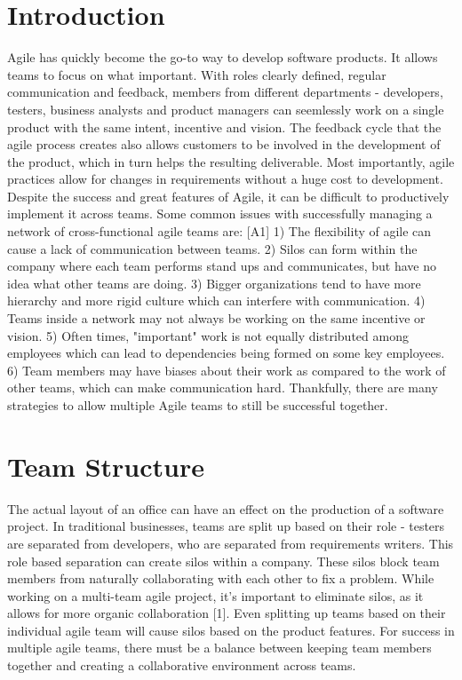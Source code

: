 \documentclass[sigplan,screen]{acmart}
\begin{document}
\section{Introduction}
Agile has quickly become the go-to way to develop software products.
It allows teams to focus on what important. With roles clearly defined, regular communication and feedback, members from different departments - developers, testers, business analysts and product managers can seemlessly work on a single product with the same intent, incentive and vision.
The feedback cycle that the agile process creates also allows customers to be involved in the development of the product, which in turn helps the resulting deliverable.
Most importantly, agile practices allow for changes in requirements without a huge cost to development.
Despite the success and great features of Agile, it can be difficult to productively implement it across teams.
Some common issues with successfully managing a network of cross-functional agile teams are: [A1]
1) The flexibility of agile can cause a lack of communication between teams. 2) Silos can form within the company where each team performs stand ups and communicates, but have no idea what other teams are doing.
3) Bigger organizations tend to have more hierarchy and more rigid culture which can interfere with communication. 4) Teams inside a network may not always be working on the same incentive or vision. 5) Often times, "important" work is not equally distributed among employees which can lead to dependencies being formed on some key employees.
6) Team members may have biases about their work as compared to the work of other teams, which can make communication hard.
Thankfully, there are many strategies to allow multiple Agile teams to still be successful together.

\section{Team Structure}
The actual layout of an office can have an effect on the production of a software project.
In traditional businesses, teams are split up based on their role - testers are separated from developers, who are separated from requirements writers.
This role based separation can create silos within a company. 
These silos block team members from naturally collaborating with each other to fix a problem.
While working on a multi-team agile project, it's important to eliminate silos, as it allows for more organic collaboration [1].
Even splitting up teams based on their individual agile team will cause silos based on the product features.
For success in multiple agile teams, there must be a balance between keeping team members together and creating a collaborative environment across teams.
\end{document}
